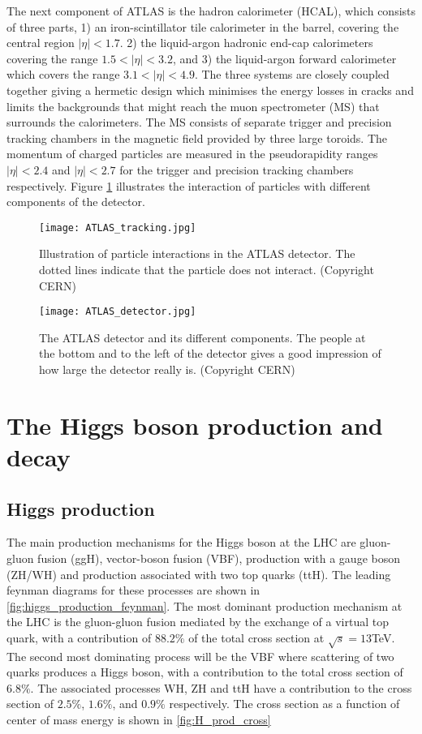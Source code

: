 \documentclass[10pt, aps, twocolumn, a4paper, nofootinbib]{revtex4}
\begin{document}
The next component of ATLAS is the hadron calorimeter (HCAL), which consists of three parts, 1) an iron-scintillator tile calorimeter in the barrel, covering the central region $|\eta|< 1.7$. 2) the liquid-argon hadronic end-cap calorimeters covering the range $1.5 < |\eta|<3.2$, and 3) the liquid-argon forward calorimeter which covers the range $3.1 < |\eta| < 4.9$. The three systems are closely coupled together giving a hermetic design which minimises the energy losses in cracks and limits the backgrounds that might reach the muon spectrometer (MS) that surrounds the calorimeters. The MS consists of separate trigger and precision tracking chambers in the magnetic field provided by three large toroids. The momentum of charged particles are measured in the pseudorapidity ranges $|\eta|<2.4$ and $|\eta|<2.7$ for the trigger and precision tracking chambers respectively. Figure \ref{fig:ATLAS_tracks} illustrates the interaction of particles with different components of the detector.

\begin{figure}
\centering
\texttt{[image: ATLAS\_tracking.jpg]}
\caption{Illustration of particle interactions in the ATLAS detector. The dotted lines indicate that the particle does not interact. (Copyright CERN) \label{fig:ATLAS_tracks}}
\end{figure}

\begin{figure}
\centering
\texttt{[image: ATLAS\_detector.jpg]}
\caption{The ATLAS detector and its different components. The people at the bottom and to the left of the detector gives a good impression of how large the detector really is. (Copyright CERN)\label{fig:ATLAS_detector}}
\end{figure}

\section{The Higgs boson production and decay}

\subsection{Higgs production \label{sec:production}}
The main production mechanisms for the Higgs boson at the LHC are gluon-gluon fusion (ggH), vector-boson fusion (VBF), production with a gauge boson (ZH/WH) and production associated with two top quarks (ttH). The leading feynman diagrams for these processes are shown in \ref{fig:higgs_production_feynman}. The most dominant production mechanism at the LHC is the gluon-gluon fusion mediated by the exchange of a virtual top quark, with a contribution of $88.2\%$ of the total cross section at $\sqrt{s} = 13$TeV\citep{PhysRevD.98.030001.2018}. The second most dominating process will be the VBF where scattering of two quarks produces a Higgs boson, with a contribution to the total cross section of $6.8\%$. The associated processes WH, ZH and ttH have a contribution to the cross section of $2.5\%$, $1.6\%$, and $0.9\%$ respectively. The cross section as a function of center of mass energy is shown in \ref{fig:H_prod_cross}
\end{document}
